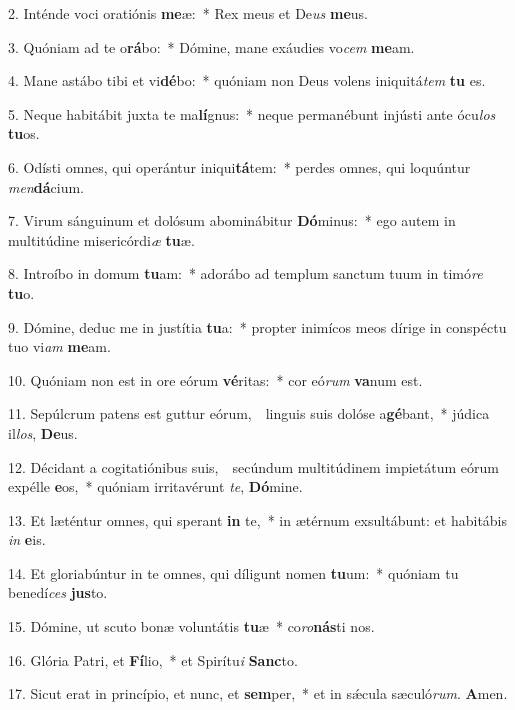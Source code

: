 
2. Inténde voci oratiónis \textbf{me}æ:~* Rex meus et De\textit{us} \textbf{me}us.

3. Quóniam ad te o\textbf{rá}bo:~* Dómine, mane exáudies vo\textit{cem} \textbf{me}am.

4. Mane astábo tibi et vi\textbf{dé}bo:~* quóniam non Deus volens iniquitá\textit{tem} \textbf{tu} es.

5. Neque habitábit juxta te ma\textbf{lí}gnus:~* neque permanébunt injústi ante ócu\textit{los} \textbf{tu}os.

6. Odísti omnes, qui operántur iniqui\textbf{tá}tem:~* perdes omnes, qui loquúntur \textit{men}\textbf{dá}cium.

7. Virum sánguinum et dolósum abominábitur \textbf{Dó}minus:~* ego autem in multitúdine misericórdi\textit{æ} \textbf{tu}æ.

8. Introíbo in domum \textbf{tu}am:~* adorábo ad templum sanctum tuum in timó\textit{re} \textbf{tu}o.

9. Dómine, deduc me in justítia \textbf{tu}a:~* propter inimícos meos dírige in conspéctu tuo vi\textit{am} \textbf{me}am.

10. Quóniam non est in ore eórum \textbf{vé}ritas:~* cor eó\textit{rum} \textbf{va}num est.

11. Sepúlcrum patens est guttur eórum,~\GreDagger\ linguis suis dolóse a\textbf{gé}bant,~* júdica il\textit{los}, \textbf{De}us.

12. Décidant a cogitatiónibus suis,~\GreDagger\ secúndum multitúdinem impietátum eórum expélle \textbf{e}os,~* quóniam irritavérunt \textit{te}, \textbf{Dó}mine.

13. Et læténtur omnes, qui sperant \textbf{in} te,~* in ætérnum exsultábunt: et habitábis \textit{in} \textbf{e}is.

14. Et gloriabúntur in te omnes, qui díligunt nomen \textbf{tu}um:~* quóniam tu benedí\textit{ces} \textbf{jus}to.

15. Dómine, ut scuto bonæ voluntátis \textbf{tu}æ~* co\textit{ro}\textbf{nás}ti nos.

16. Glória Patri, et \textbf{Fí}lio,~* et Spirítu\textit{i} \textbf{Sanc}to.

17. Sicut erat in princípio, et nunc, et \textbf{sem}per,~* et in s\'{\ae}cula sæculó\textit{rum}. \textbf{A}men.